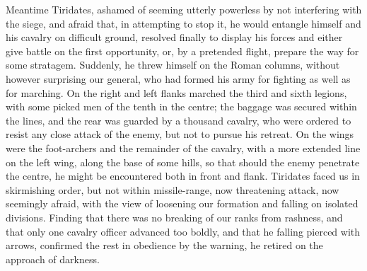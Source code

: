 Meantime Tiridates, ashamed of seeming utterly powerless by not interfering with the siege, and afraid that, in attempting to stop it, he would entangle himself and his cavalry on difficult ground, resolved finally to display his forces and either give battle on the first opportunity, or, by a pretended flight, prepare the way for some stratagem. Suddenly, he threw himself on the Roman columns, without however surprising our general, who had formed his army for fighting as well as for marching. On the right and left flanks marched the third and sixth legions, with some picked men of the tenth in the centre; the baggage was secured within the lines, and the rear was guarded by a thousand cavalry, who were ordered to resist any close attack of the enemy, but not to pursue his retreat. On the wings were the foot-archers and the remainder of the cavalry, with a more extended line on the left wing, along the base of some hills, so that should the enemy penetrate the centre, he might be encountered both in front and flank. Tiridates faced us in skirmishing order, but not within missile-range, now threatening attack, now seemingly afraid, with the view of loosening our formation and falling on isolated divisions. Finding that there was no breaking of our ranks from rashness, and that only one cavalry officer advanced too boldly, and that he falling pierced with arrows, confirmed the rest in obedience by the warning, he retired on the approach of darkness.


